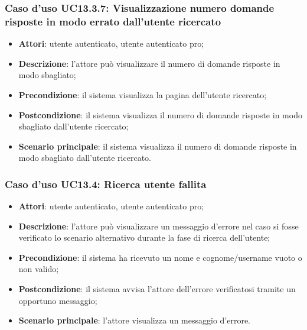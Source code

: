 \subsubsection{Caso d'uso UC13.3.7: Visualizzazione numero domande risposte in modo errato dall'utente ricercato}
\begin{itemize}
	\item\textbf{Attori}: utente autenticato, utente autenticato pro;
	\item\textbf{Descrizione}: l'attore può visualizzare il numero di domande risposte in modo sbagliato;
	\item\textbf{Precondizione}: il sistema visualizza la pagina dell'utente ricercato;
	\item\textbf{Postcondizione}: il sistema visualizza il numero di domande risposte in modo sbagliato dall'utente ricercato;
	\item\textbf{Scenario principale}: il sistema visualizza il numero di domande risposte in modo sbagliato dall'utente ricercato.
\end{itemize}

\subsubsection{Caso d'uso UC13.4: Ricerca utente fallita}

\begin{itemize}
	\item \textbf{Attori}: utente autenticato, utente autenticato pro;
	\item \textbf{Descrizione}: l'attore può visualizzare un messaggio d'errore nel caso si fosse verificato lo scenario alternativo durante la fase di ricerca dell'utente;
	\item \textbf{Precondizione}: il sistema ha ricevuto un nome e cognome/username vuoto o non valido;
	\item \textbf{Postcondizione}: il sistema avvisa l'attore dell'errore verificatosi tramite un opportuno messaggio;
\item\textbf{Scenario principale}: l'attore visualizza un messaggio d'errore.
\end{itemize}